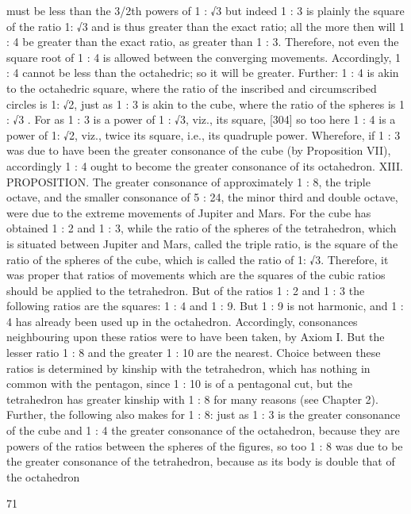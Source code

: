 \documentclass{article}
\begin{document}
must be less than the 3/2th powers of 1 : √3 but indeed 1 : 3 is plainly the
square of the ratio 1: √3 and is thus greater than the exact ratio; all the
more then will 1 : 4 be greater than the exact ratio, as greater than 1 : 3.
Therefore, not even the square root of 1 : 4 is allowed between the
converging movements. Accordingly, 1 : 4 cannot be less than the
octahedric; so it will be greater.
Further: 1 : 4 is akin to the octahedric square, where the ratio of the
inscribed and circumscribed circles is 1: √2, just as 1 : 3 is akin to the
cube, where the ratio of the spheres is 1 : √3 . For as 1 : 3 is a power of 1 :
√3, viz., its square, [304] so too here 1 : 4 is a power of 1: √2, viz., twice
its square, i.e., its quadruple power. Wherefore, if 1 : 3 was due to have
been the greater consonance of the cube (by Proposition VII),
accordingly 1 : 4 ought to become the greater consonance of its
octahedron.
XIII. PROPOSITION. The greater consonance of approximately 1 : 8, the
triple octave, and the smaller consonance of 5 : 24, the minor third and
double octave, were due to the extreme movements of Jupiter and Mars.
For the cube has obtained 1 : 2 and 1 : 3, while the ratio of the spheres of
the tetrahedron, which is situated between Jupiter and Mars, called the
triple ratio, is the square of the ratio of the spheres of the cube, which is
called the ratio of 1: √3. Therefore, it was proper that ratios of
movements which are the squares of the cubic ratios should be applied to
the tetrahedron. But of the ratios 1 : 2 and 1 : 3 the following ratios are
the squares: 1 : 4 and 1 : 9. But 1 : 9 is not harmonic, and 1 : 4 has already
been used up in the octahedron. Accordingly, consonances neighbouring
upon these ratios were to have been taken, by Axiom I. But the lesser
ratio 1 : 8 and the greater 1 : 10 are the nearest. Choice between these
ratios is determined by kinship with the tetrahedron, which has nothing
in common with the pentagon, since 1 : 10 is of a pentagonal cut, but the
tetrahedron has greater kinship with 1 : 8 for many reasons (see Chapter
2).
Further, the following also makes for 1 : 8: just as 1 : 3 is the greater
consonance of the cube and 1 : 4 the greater consonance of the
octahedron, because they are powers of the ratios between the spheres of
the figures, so too 1 : 8 was due to be the greater consonance of the
tetrahedron, because as its body is double that of the octahedron


71
\end{document}

